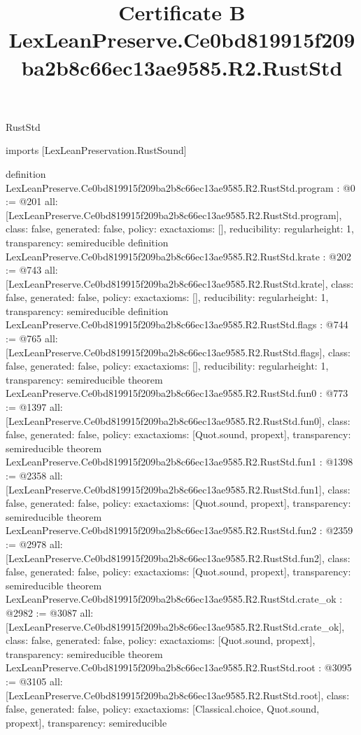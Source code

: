 \begin{lexlean}{RustStd}
\title{Certificate B LexLeanPreserve.Ce0bd819915f209ba2b8c66ec13ae9585.R2.RustStd}
\begin{coremodule}
imports [LexLeanPreservation.RustSound]

definition LexLeanPreserve.Ce0bd819915f209ba2b8c66ec13ae9585.R2.RustStd.program : @0 := @201 {
  all: [LexLeanPreserve.Ce0bd819915f209ba2b8c66ec13ae9585.R2.RustStd.program],
  class: false,
  generated: false,
  policy: exact{axioms: []},
  reducibility: regular{height: 1},
  transparency: semireducible
}
definition LexLeanPreserve.Ce0bd819915f209ba2b8c66ec13ae9585.R2.RustStd.krate : @202 := @743 {
  all: [LexLeanPreserve.Ce0bd819915f209ba2b8c66ec13ae9585.R2.RustStd.krate],
  class: false,
  generated: false,
  policy: exact{axioms: []},
  reducibility: regular{height: 1},
  transparency: semireducible
}
definition LexLeanPreserve.Ce0bd819915f209ba2b8c66ec13ae9585.R2.RustStd.flags : @744 := @765 {
  all: [LexLeanPreserve.Ce0bd819915f209ba2b8c66ec13ae9585.R2.RustStd.flags],
  class: false,
  generated: false,
  policy: exact{axioms: []},
  reducibility: regular{height: 1},
  transparency: semireducible
}
theorem LexLeanPreserve.Ce0bd819915f209ba2b8c66ec13ae9585.R2.RustStd.fun0 : @773 := @1397 {
  all: [LexLeanPreserve.Ce0bd819915f209ba2b8c66ec13ae9585.R2.RustStd.fun0],
  class: false,
  generated: false,
  policy: exact{axioms: [Quot.sound, propext]},
  transparency: semireducible
}
theorem LexLeanPreserve.Ce0bd819915f209ba2b8c66ec13ae9585.R2.RustStd.fun1 : @1398 := @2358 {
  all: [LexLeanPreserve.Ce0bd819915f209ba2b8c66ec13ae9585.R2.RustStd.fun1],
  class: false,
  generated: false,
  policy: exact{axioms: [Quot.sound, propext]},
  transparency: semireducible
}
theorem LexLeanPreserve.Ce0bd819915f209ba2b8c66ec13ae9585.R2.RustStd.fun2 : @2359 := @2978 {
  all: [LexLeanPreserve.Ce0bd819915f209ba2b8c66ec13ae9585.R2.RustStd.fun2],
  class: false,
  generated: false,
  policy: exact{axioms: [Quot.sound, propext]},
  transparency: semireducible
}
theorem LexLeanPreserve.Ce0bd819915f209ba2b8c66ec13ae9585.R2.RustStd.crate_ok : @2982 := @3087 {
  all: [LexLeanPreserve.Ce0bd819915f209ba2b8c66ec13ae9585.R2.RustStd.crate_ok],
  class: false,
  generated: false,
  policy: exact{axioms: [Quot.sound, propext]},
  transparency: semireducible
}
theorem LexLeanPreserve.Ce0bd819915f209ba2b8c66ec13ae9585.R2.RustStd.root : @3095 := @3105 {
  all: [LexLeanPreserve.Ce0bd819915f209ba2b8c66ec13ae9585.R2.RustStd.root],
  class: false,
  generated: false,
  policy: exact{axioms: [Classical.choice, Quot.sound, propext]},
  transparency: semireducible
}


\end{coremodule}
\end{lexlean}
